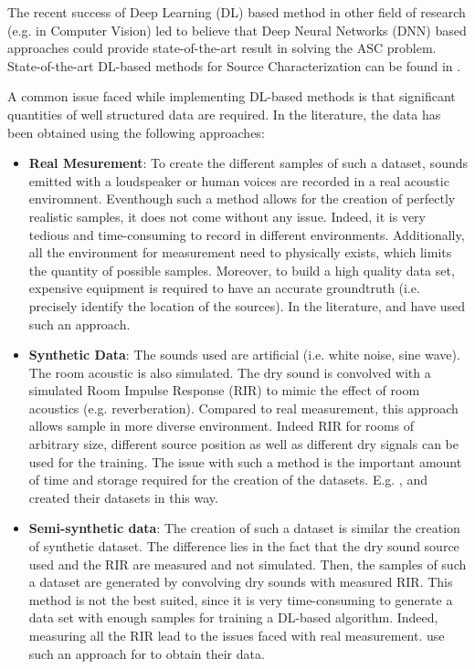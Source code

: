 \documentclass[11pt,a4paper,twoside]{report}
\begin{document}
The recent success of Deep Learning (DL) based method in other field of research (e.g. \cite{ronneberger2015u} in Computer Vision) led to believe that Deep Neural Networks (DNN) based approaches could provide state-of-the-art result in solving the ASC problem. State-of-the-art DL-based methods for Source Characterization can be found in \cite{grumiaux2022survey}.

A common issue faced while implementing DL-based methods is that significant quantities of well structured data are required. In the literature, the data has been obtained using the following approaches:

\begin{itemize}
    \item \textbf{Real Mesurement}: To create the different samples of such a dataset, sounds emitted with a loudspeaker or human voices are recorded in a real acoustic enviromnent. Eventhough such a method allows for the creation of perfectly realistic samples, it does not come without any issue. Indeed, it is very tedious and time-consuming to record in different environments. Additionally, all the environment for measurement need to physically exists, which limits the quantity of possible samples. Moreover, to build a high quality data set, expensive equipment is required to have an accurate groundtruth (i.e. precisely identify the location of the sources). In the literature, \cite{he2018deep} and \cite{ferguson2018sound} have used such an approach.
    \item \textbf{Synthetic Data}: The sounds used are artificial (i.e. white noise, sine wave). The room acoustic is also simulated. The dry sound is convolved with a simulated Room Impulse Response (RIR) to mimic the effect of room acoustics (e.g. reverberation). Compared to real measurement, this approach allows sample in more diverse environment. Indeed RIR for rooms of arbitrary size, different source position as well as different dry signals can be used for the training. The issue with such a method is the important amount of time and storage required for the creation of the datasets. E.g. \cite{chakrabarty2017broadband}, \cite{perotin2018crnn} and \cite{adavanne2018direction} created their datasets in this way.
    \item \textbf{Semi-synthetic data}: The creation of such a dataset is similar the creation of synthetic dataset. The difference lies in the fact that the dry sound source used and the RIR are measured and not simulated. Then, the samples of such a dataset are generated by convolving dry sounds with measured RIR. This method is not the best suited, since it is very time-consuming to generate a data set with enough samples for training a DL-based algorithm. Indeed, measuring all the RIR lead to the issues faced with real measurement. \cite{takeda2016sound} use such an approach for to obtain their data.
\end{itemize}
\end{document}
